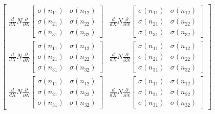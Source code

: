 \documentclass[11pt]{article}
\begin{document}
    $\displaystyle \left[\begin{matrix}\frac{d}{d X} N \frac{\partial}{\partial N} \left[\begin{matrix}\sigma{\left(n_{11} \right)} & \sigma{\left(n_{12} \right)}\\\sigma{\left(n_{21} \right)} & \sigma{\left(n_{22} \right)}\\\sigma{\left(n_{31} \right)} & \sigma{\left(n_{32} \right)}\end{matrix}\right] & \frac{d}{d X} N \frac{\partial}{\partial N} \left[\begin{matrix}\sigma{\left(n_{11} \right)} & \sigma{\left(n_{12} \right)}\\\sigma{\left(n_{21} \right)} & \sigma{\left(n_{22} \right)}\\\sigma{\left(n_{31} \right)} & \sigma{\left(n_{32} \right)}\end{matrix}\right]\\\frac{d}{d X} N \frac{\partial}{\partial N} \left[\begin{matrix}\sigma{\left(n_{11} \right)} & \sigma{\left(n_{12} \right)}\\\sigma{\left(n_{21} \right)} & \sigma{\left(n_{22} \right)}\\\sigma{\left(n_{31} \right)} & \sigma{\left(n_{32} \right)}\end{matrix}\right] & \frac{d}{d X} N \frac{\partial}{\partial N} \left[\begin{matrix}\sigma{\left(n_{11} \right)} & \sigma{\left(n_{12} \right)}\\\sigma{\left(n_{21} \right)} & \sigma{\left(n_{22} \right)}\\\sigma{\left(n_{31} \right)} & \sigma{\left(n_{32} \right)}\end{matrix}\right]\\\frac{d}{d X} N \frac{\partial}{\partial N} \left[\begin{matrix}\sigma{\left(n_{11} \right)} & \sigma{\left(n_{12} \right)}\\\sigma{\left(n_{21} \right)} & \sigma{\left(n_{22} \right)}\\\sigma{\left(n_{31} \right)} & \sigma{\left(n_{32} \right)}\end{matrix}\right] & \frac{d}{d X} N \frac{\partial}{\partial N} \left[\begin{matrix}\sigma{\left(n_{11} \right)} & \sigma{\left(n_{12} \right)}\\\sigma{\left(n_{21} \right)} & \sigma{\left(n_{22} \right)}\\\sigma{\left(n_{31} \right)} & \sigma{\left(n_{32} \right)}\end{matrix}\right]\end{matrix}\right]$
\end{document}

